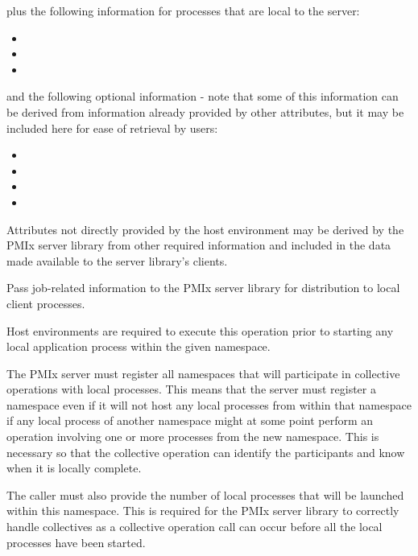 plus the following information for processes that are local to the server:

\begin{itemize}
    \item {}
    \item {}
    \item {}
\end{itemize}

and the following optional information - note that some of this information can be derived from information already provided by other attributes, but it may be included here for ease of retrieval by users:

\begin{itemize}
    \item {}
    \item {}
    \item {}
    \item {}
\end{itemize}

\divider

Attributes not directly provided by the host environment may be derived by the \ac{PMIx} server library from other required information and included in the data made available to the server library's clients.
\reqattrend


\descr

Pass job-related information to the \ac{PMIx} server library for distribution to local client processes.

\advicermstart
Host environments are required to execute this operation prior to starting any local application process within the given namespace.

The \ac{PMIx} server must register all namespaces that will participate in collective operations with local processes.
This means that the server must register a namespace even if it will not host any local processes from within that namespace if any local process of another namespace might at some point perform an operation involving one or more processes from the new namespace.
This is necessary so that the collective operation can identify the participants and know when it is locally complete.

The caller must also provide the number of local processes that will be launched within this namespace.
This is required for the \ac{PMIx} server library to correctly handle collectives as a collective operation call can occur before all the local processes have been started.

